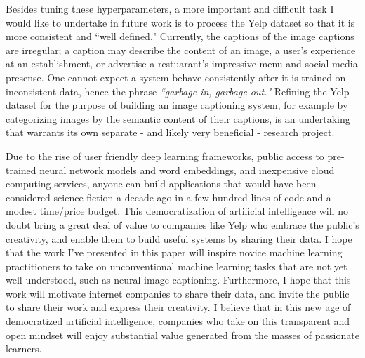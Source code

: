 \documentclass[letterpaper, 10 pt, conference]{ieeeconf}
\begin{document}
Besides tuning these hyperparameters, a more important and difficult task I would like to undertake in future work is to process the Yelp dataset so that it is more consistent and ``well defined." Currently, the captions of the image captions are irregular; a caption may describe the content of an image, a user's experience at an establishment, or advertise a restuarant's impressive menu and social media presense. One cannot expect a system behave consistently after it is trained on inconsistent data, hence the phrase \textit{``garbage in, garbage out."} Refining the Yelp dataset for the purpose of building an image captioning system, for example by categorizing images by the semantic content of their captions, is an undertaking that warrants its own separate - and likely very beneficial - research project. 

Due to the rise of user friendly deep learning frameworks, public access to pre-trained neural network models and word embeddings, and inexpensive cloud computing services, anyone can build applications that would have been considered science fiction a decade ago in a few hundred lines of code and a modest time/price budget. This democratization of artificial intelligence will no doubt bring a great deal of value to companies like Yelp who embrace the public's creativity, and enable them to build useful systems by sharing their data. I hope that the work I've presented in this paper will inspire novice machine learning practitioners to take on unconventional machine learning tasks that are not yet well-understood, such as neural image captioning. Furthermore, I hope that this work will motivate internet companies to share their data, and invite the public to share their work and express their creativity. I believe that in this new age of democratized artificial intelligence, companies who take on this transparent and open mindset will enjoy substantial value generated from the masses of passionate learners.

\newpage


\end{document}

